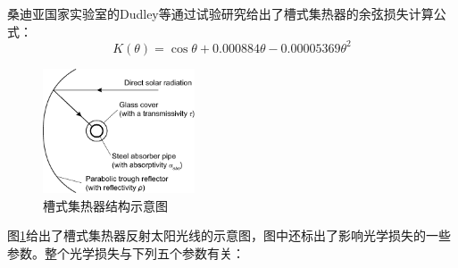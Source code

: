 桑迪亚国家实验室的Dudley等\cite{Dudley1994}通过试验研究给出了槽式集热器的余弦损失计算公式：
\begin{equation}
  K(\theta) = \cos\theta+0.000884\theta-0.00005369\theta^2
\end{equation}

\begin{figure}[!ht]
\centering
\includegraphics[width=0.4\textwidth]{fig/ParametersOfParablicDish.pdf}
\caption{槽式集热器结构示意图}\label{fig:ParabolicTrough}
\end{figure}
图\ref{fig:ParabolicTrough}给出了槽式集热器反射太阳光线的示意图，图中还标出了影响光学损失的一些参数。整个光学损失与下列五个参数有关：

